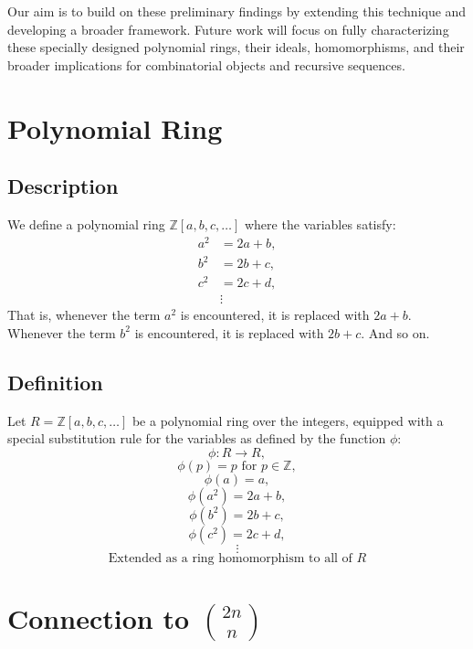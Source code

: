 \documentclass{article}
\theoremstyle{plain}
\theoremstyle{definition}
\begin{document}
Our aim is to build on these preliminary findings by extending this technique and developing a broader framework. Future work will focus on fully characterizing these specially designed polynomial rings, their ideals, homomorphisms, and their broader implications for combinatorial objects and recursive sequences.

\section{Polynomial Ring}
\subsection{Description}
We define a polynomial ring \(\mathbb{Z}[a, b, c, \ldots]\) where the variables satisfy:
\[
\begin{aligned}
    a^2 &= 2a + b, \\
    b^2 &= 2b + c, \\
    c^2 &= 2c + d, \\
    &\vdots
\end{aligned}
\]
That is, whenever the term \( a^2 \) is encountered, it is replaced with \( 2a + b \). Whenever the term \( b^2 \) is encountered, it is replaced with \( 2b + c \). And so on.

\subsection{Definition} \label{sec:2.2}
Let \(R = \mathbb{Z}[a, b, c, \ldots]\) be a polynomial ring over the integers, equipped with a special substitution rule for the variables as defined by the function \(\phi\):
\[
    \phi: R \to R,
\]
\[
    \phi(p) = p \text{ for } p \in \mathbb{Z},
\]
\[
    \phi(a) = a,
\]
\[
    \phi(a^2) = 2a + b,
\]
\[
    \phi(b^2) = 2b + c,
\]
\[
    \phi(c^2) = 2c + d,
\]
\[
    \vdots
\]
\[
\text{Extended as a ring homomorphism to all of } R
\]
\section[Connection to Central Binomial Coefficients]{Connection to \(\binom{2n}{n}\)}
\end{document}

